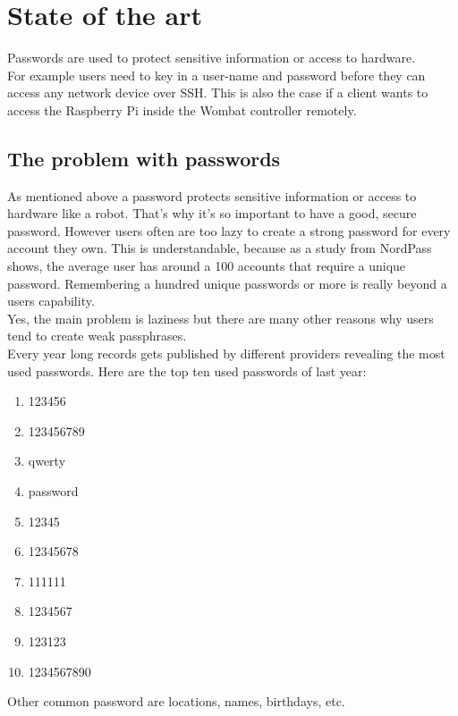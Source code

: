 \documentclass[conference]{IEEEtran}
\begin{document}
\section{State of the art}
Passwords are used to protect sensitive information or access to hardware.\\
For example users need to key in a user-name and password before they can access any network device over SSH. This is also the case if a client wants to access the Raspberry Pi inside the Wombat controller remotely. 

\subsection{The problem with passwords} \cite{b1} \cite{b2}
As mentioned above a password protects sensitive information or access to hardware like a robot. That's why it's so important to have a good, secure password. However users often are too lazy to create a strong password for every account they own. This is understandable, because as a study from NordPass shows, the average user has around a 100 accounts that require a unique password. Remembering a hundred unique passwords or more is really beyond a users capability.\\
Yes, the main problem is laziness but there are many other reasons why users tend to create weak passphrases.\\
Every year long records gets published by different providers revealing the most used passwords. Here are the top ten used passwords of last year: \cite{b3}
\begin{enumerate}
\item 123456
\item 123456789
\item qwerty
\item password
\item 12345
\item 12345678
\item 111111
\item 1234567
\item 123123
\item 1234567890
\end{enumerate}
Other common password are locations, names, birthdays, etc.
\end{document}

